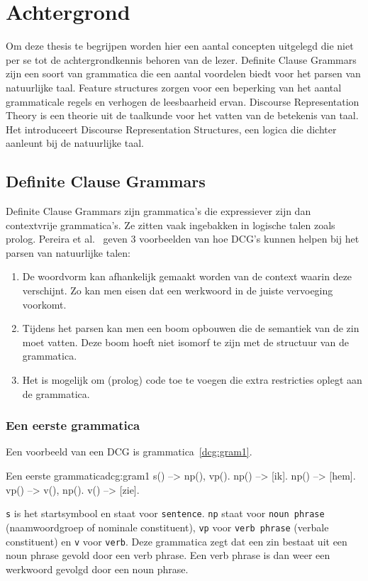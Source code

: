 \chapter{Achtergrond}
Om deze thesis te begrijpen worden hier een aantal concepten uitgelegd die niet per se tot de achtergrondkennis behoren van de lezer. Definite Clause Grammars zijn een soort van grammatica die een aantal voordelen biedt voor het parsen van natuurlijke taal. Feature structures zorgen voor een beperking van het aantal grammaticale regels en verhogen de leesbaarheid ervan. Discourse Representation Theory is een theorie uit de taalkunde voor het vatten van de betekenis van taal. Het introduceert Discourse Representation Structures, een logica die dichter aanleunt bij de natuurlijke taal.

\section{Definite Clause Grammars}
\label{sec:DCG}
Definite Clause Grammars \cite{Pereira1980} zijn grammatica's die expressiever zijn dan contextvrije grammatica's. Ze zitten vaak ingebakken in logische talen zoals prolog. Pereira et al.\ \cite{Pereira1980} geven 3 voorbeelden van hoe DCG's kunnen helpen bij het parsen van natuurlijke talen:

\begin{enumerate}
  \item De woordvorm kan afhankelijk gemaakt worden van de context waarin deze verschijnt. Zo kan men eisen dat een werkwoord in de juiste vervoeging voorkomt.
  \item Tijdens het parsen kan men een boom opbouwen die de semantiek van de zin moet vatten. Deze boom hoeft niet isomorf te zijn met de structuur van de grammatica.
  \item Het is mogelijk om (prolog) code toe te voegen die extra restricties oplegt aan de grammatica.
\end{enumerate}

\subsection{Een eerste grammatica}
Een voorbeeld van een DCG is grammatica~\ref{dcg:gram1}.
\begin{dcg}{Een eerste grammatica}{dcg:gram1}
s() --> np(), vp().
np() --> [ik].
np() --> [hem].
vp() --> v(), np().
v() --> [zie].
\end{dcg}
\texttt{s} is het startsymbool en staat voor \texttt{sentence}. \texttt{np} staat voor \texttt{noun phrase} (naamwoordgroep of nominale constituent), \texttt{vp} voor \texttt{verb phrase} (verbale constituent) en \texttt{v} voor \texttt{verb}. Deze grammatica zegt dat een zin bestaat uit een noun phrase gevold door een verb phrase. Een verb phrase is dan weer een werkwoord gevolgd door een noun phrase.

